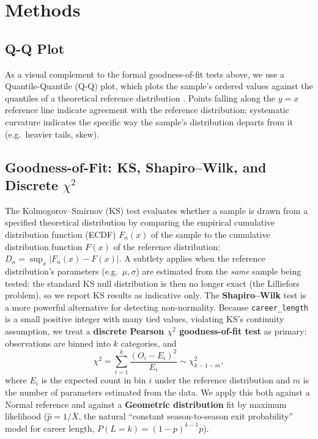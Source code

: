 \documentclass[10pt,twocolumn]{article}
\begin{document}
\section{Methods}
\label{sec:methods}

\subsection{Q-Q Plot}
As a visual complement to the formal goodness-of-fit tests above, we
use a Quantile-Quantile (Q-Q) plot, which plots the sample's ordered
values against the quantiles of a theoretical reference distribution
\citep{wikiqq2024}. Points falling along the $y=x$ reference line
indicate agreement with the reference distribution; systematic curvature
indicates the specific way the sample's distribution departs from it
(e.g.\ heavier tails, skew).

\subsection{Goodness-of-Fit: KS, Shapiro--Wilk, and Discrete $\chi^2$}
The Kolmogorov--Smirnov (KS) test evaluates whether a sample is drawn
from a specified theoretical distribution by comparing the empirical
cumulative distribution function (ECDF) $F_n(x)$ of the sample to the
cumulative distribution function $F(x)$ of the reference distribution:
$D_n = \sup_x | F_n(x) - F(x) |$. A subtlety applies when the reference
distribution's parameters (e.g.\ $\mu,\sigma$) are estimated from the
\textit{same} sample being tested: the standard KS null distribution is
then no longer exact (the Lilliefors problem), so we report KS results
as indicative only. The \textbf{Shapiro--Wilk} test is a more powerful
alternative for detecting non-normality. Because \texttt{career\_length}
is a small positive integer with many tied values, violating KS's
continuity assumption, we treat a \textbf{discrete Pearson $\chi^2$
goodness-of-fit test} as primary: observations are binned into $k$
categories, and
\[
  \chi^2 = \sum_{i=1}^{k} \frac{(O_i - E_i)^2}{E_i} \sim \chi^2_{k-1-m},
\]
where $E_i$ is the expected count in bin $i$ under the reference
distribution and $m$ is the number of parameters estimated from the
data. We apply this both against a Normal reference and against a
\textbf{Geometric distribution} fit by maximum likelihood
($\hat p = 1/\bar{X}$, the natural ``constant season-to-season exit
probability'' model for career length, $P(L=k)=(1-p)^{k-1}p$).
\end{document}
